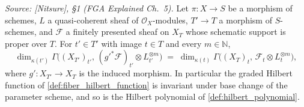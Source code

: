 \begin{lemma}\leanok
  \label{lem:hilbert_fibre_base_change}
  \textit{Source: [Nitsure], \S 1 (FGA Explained Ch.~5).}
  Let \(\pi : X \to S\) be a morphism of schemes, \(L\) a quasi-coherent
  sheaf of \(\mathcal{O}_X\)-modules, \(T' \to T\) a morphism of
  \(S\)-schemes, and
  \(\mathcal{F}\) a finitely presented sheaf on \(X_T\) whose schematic
  support is proper over \(T\).  For \(t' \in T'\) with image \(t \in T\)
  and every \(m \in \mathbb{N}\),
  \[
    \dim_{\kappa(t')} \Gamma\bigl((X_{T'})_{t'},\,
      (g'^*\mathcal{F})_{t'} \otimes L_{t'}^{\otimes m}\bigr)
    \;=\;
    \dim_{\kappa(t)} \Gamma\bigl((X_T)_t,\,
      \mathcal{F}_t \otimes L_t^{\otimes m}\bigr),
  \]
  where \(g' : X_{T'} \to X_T\) is the induced morphism.  In particular the
  graded Hilbert function of \cref{def:fiber_hilbert_function} is invariant
  under base change of the parameter scheme, and so is the Hilbert polynomial
  of \cref{def:hilbert_polynomial}.
\end{lemma}
